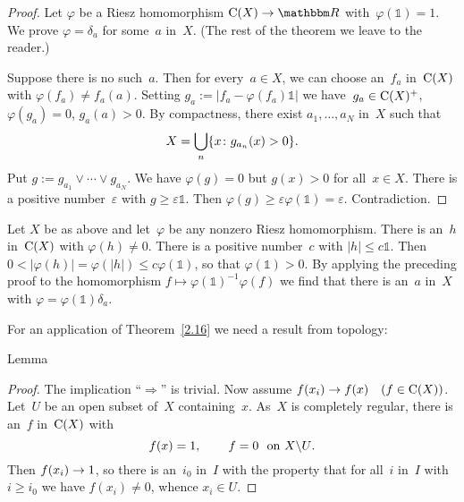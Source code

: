 \documentclass[main.tex]{subfiles}
\begin{document}
\begin{proof}
Let $\varphi$ be a Riesz homomorphism $\Cont{X}\ra \R$
with~$\varphi(\mathbb{1})=1$.
We prove $\varphi=\delta_a$ for some~$a$ in~$X$.
(The rest of the theorem 
we leave to the reader.)

Suppose there is no such~$a$.
Then for every~$a\in X$,
we can choose an~$f_a$ in~$\mathrm{C}(X)$
with $\varphi(f_a)\neq f_a(a)$.
Setting $g_a := | f_a - \varphi(f_a) \mathbb{1}|$
we have~$g_a \in \mathrm{C}(X)^+$,
$\varphi(g_a)=0$,
$g_a(a)>0$.
By compactness,
there exist $a_1,\dotsc,a_N$ in~$X$ such that
\begin{equation*}
X = \bigcup_n \{ x\colon g_{a_n} (x) > 0 \}\text{.}
\end{equation*}
Put $g:=g_{a_1}\vee \dotsb \vee g_{a_N}$.
We have $\varphi(g) =0$ 
but $g(x)>0$ for all~$x\in X$.
There is a positive number~$\varepsilon$
with $g\geq \varepsilon \mathbb{1}$.
Then $\varphi(g)\geq \varepsilon \varphi(\mathbb{1})=\varepsilon$.
Contradiction. \xqed
\end{proof}
%
%
\begin{psec}{2.17}%
Let $X$ be as above 
and let~$\varphi$ be any nonzero Riesz homomorphism.
There is an~$h$ in~$\mathrm{C}(X)$
with $\varphi(h)\neq 0$.
There is a positive number~$c$
with $|h|\leq c\mathbb{1}$.
Then $0<|\varphi(h)|=\varphi(|h|)\leq c\varphi(\mathbb{1})$,
so that $\varphi(\mathbb{1})>0$.
By applying the preceding proof to
the homomorphism $f\mapsto \varphi(\mathbb{1})^{-1} \varphi(f)$
we find that there is an~$a$ in~$X$ 
with $\varphi = \varphi(\mathbb{1})\delta_a$.
\end{psec}
%
%
For an application of Theorem~\ref{2.16}
we need a result from topology:
\begin{psec}{2.18}{Lemma}
\end{psec}
\begin{proof}
The implication ``$\Rightarrow$'' is trivial.
Now assume $f(x_i)\rightarrow f(x)\quad (f\in \mathrm{C}(X))$.
Let~$U$ be an open subset of~$X$ containing~$x$.
As~$X$ is completely regular,
there is an~$f$ in~$\mathrm{C}(X)$ with
\begin{equation*}
f(x)=1\text{, } 
\qquad f=0\ \text{ on }X\backslash U
\text{.}
\end{equation*}
Then $f(x_i)\rightarrow 1$, 
so there is an~$i_0$ in~$I$ with the property
that for all~$i$ in~$I$ with $i\ge i_0$
we have $f(x_i)\neq 0$, whence $x_i \in U$. \xqed
\end{proof}
\end{document}
